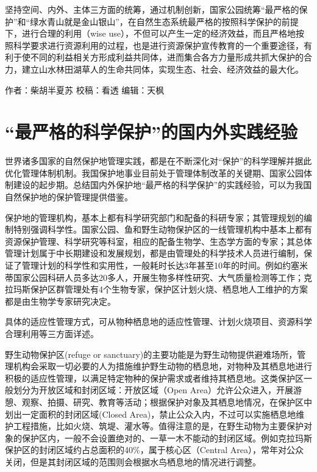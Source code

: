 \documentclass[
]{book}
\begin{document}
坚持空间、内外、主体三方面的统筹，通过机制创新，国家公园统筹``最严格的保护''和``绿水青山就是金山银山''，在自然生态系统最严格的按照科学保护的前提下，进行合理的利用（wise use），不但可以产生一定的经济效益，而且严格地按照科学要求进行资源利用的过程，也是进行资源保护宣传教育的一个重要途径，有利于使不同的利益相关方形成利益共同体，进而集合各方力量形成共抓大保护的合力，建立山水林田湖草人的生命共同体，实现生态、社会、经济效益的最大化。

作者：柴胡半夏苏
校稿：看透
编辑：天枫

\hypertarget{ux6700ux4e25ux683cux7684ux79d1ux5b66ux4fddux62a4ux7684ux56fdux5185ux5916ux5b9eux8df5ux7ecfux9a8c}{%
\section{``最严格的科学保护''的国内外实践经验}\label{ux6700ux4e25ux683cux7684ux79d1ux5b66ux4fddux62a4ux7684ux56fdux5185ux5916ux5b9eux8df5ux7ecfux9a8c}}

世界诸多国家的自然保护地管理实践，都是在不断深化对``保护''的科学理解并据此优化管理体制机制。我国保护地事业目前处于管理体制改革的关键期、国家公园体制建设的起步期。总结国内外保护地``最严格的科学保护''的实践经验，可以为我国自然保护地的保护管理提供借鉴。

保护地的管理机构，基本上都有科学研究部门和配备的科研专家；其管理规划的编制特别强调科学性。国家公园、鱼和野生动物保护区的一线管理机构中基本上都有资源保护管理、科学研究等科室，相应的配备生物学、生态学方面的专家；其总体管理计划属于中长期建设和发展规划，都是由管理处的科学技术人员进行编制，保证了管理计划的科学性和实用性，一般耗时长达3年甚至10年的时间。例如约塞米蒂国家公园科研人员多达20多人，开展生物多样性研究、大气质量检测等工作；克拉玛斯保护区群管理处有4个生物专家，保护区计划火烧、栖息地人工维护的方案都是由生物学专家研究决定。

具体的适应性管理方式，可从物种栖息地的适应性管理、计划火烧项目、资源科学合理利用等三方面详述。

野生动物保护区(refuge or sanctuary)的主要功能是为野生动物提供避难场所，管理机构会采取一切必要的人为措施维护野生动物的栖息地，对物种及其栖息地进行积极的适应性管理，以满足特定物种的保护需求或者维持其栖息地。这类保护区一般划分为开放区域和封闭区域：开放区域（Open Area）允许公众进入，开展游憩、观察、拍摄、研究、教育等活动；根据保护对象及其栖息地情况，在保护区中划出一定面积的封闭区域(Closed Area)，禁止公众入内，不过可以实施栖息地维护工程措施，比如火烧、筑堤、灌水等。值得注意的是，在野生动物为主要保护对象的保护区内，一般不会设置绝对的、一草一木不能动的封闭区域。例如克拉玛斯保护区的封闭区域约占总面积的40\%，属于核心区（Central Area），常年对公众关闭，但是其封闭区域的范围则会根据水鸟栖息地的情况进行调整。
\end{document}
